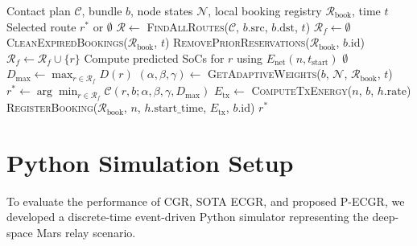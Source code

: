 \documentclass[journal,twocolumn]{IEEEtran}
\newcommand{\ecgr}{\textsf{ECGR}}
\newcommand{\pecgr}{\textsf{P-ECGR}}
\begin{document}
\begin{algorithm}[t]
\caption{\pecgr{} Route Selection and Energy Booking}
\label{alg:pecgr}
\begin{algorithmic}[1]
\REQUIRE Contact plan $\mathcal{C}$, bundle $b$, node states $\mathcal{N}$, local booking registry $\mathcal{R}_{\text{book}}$, time $t$
\ENSURE Selected route $r^*$ or $\emptyset$
\STATE $\mathcal{R} \leftarrow$ \textsc{FindAllRoutes}($\mathcal{C}$, $b.\text{src}$, $b.\text{dst}$, $t$)
\STATE $\mathcal{R}_f \leftarrow \emptyset$
\STATE \textsc{CleanExpiredBookings}($\mathcal{R}_{\text{book}}$, $t$)
\STATE \textsc{RemovePriorReservations}($\mathcal{R}_{\text{book}}$, $b.\text{id}$)
        \STATE $\mathcal{R}_f \leftarrow \mathcal{R}_f \cup \{r\}$
        \STATE Compute predicted SoCs for $r$ using $E_{\text{net}}(n, t_{\text{start}})$
    \ENDIF
\ENDFOR
{}
    \RETURN $\emptyset$
\ENDIF
\STATE $D_{\max} \leftarrow \max_{r \in \mathcal{R}_f} D(r)$
\STATE $(\alpha, \beta, \gamma) \leftarrow$ \textsc{GetAdaptiveWeights}($b$, $\mathcal{N}$, $\mathcal{R}_{\text{book}}$, $t$)
\STATE $r^* \leftarrow \arg\min_{r \in \mathcal{R}_f} \mathcal{C}(r, b; \alpha, \beta, \gamma, D_{\max})$
        \STATE $E_{\text{tx}} \leftarrow$ \textsc{ComputeTxEnergy}($n$, $b$, $h.\text{rate}$)
        \STATE \textsc{RegisterBooking}($\mathcal{R}_{\text{book}}$, $n$, $h.\text{start\_time}$, $E_{\text{tx}}$, $b.\text{id}$)
    \ENDFOR
\ENDIF
\RETURN $r^*$
\end{algorithmic}
\end{algorithm}

\section{Python Simulation Setup}
\label{sec:setup}

To evaluate the performance of CGR, SOTA \ecgr{}, and proposed \pecgr{}, we developed a discrete-time event-driven Python simulator representing the deep-space Mars relay scenario.
\end{document}

